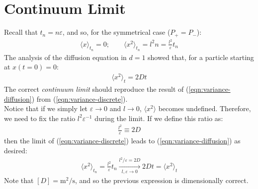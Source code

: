 \documentclass[../template.tex]{subfiles}
\begin{document}
\section{Continuum Limit}
Recall that $t_n = n \varepsilon$, and so, for the symmetrical case ($P_+ = P_-$):
\begin{align}
    \langle x \rangle_{t_n} = 0; \qquad \langle x^2 \rangle_{t_n} = l^2 n = \frac{l^2}{\varepsilon} t_n
    \label{eqn:variance-discrete}
\end{align}
The analysis of the diffusion equation in $d=1$ showed that, for a particle starting at $x(t=0) = 0$: 
\begin{align}
    \langle x^2 \rangle_t = 2Dt
    \label{eqn:variance-diffusion}
\end{align}
The correct \textit{continuum limit} should reproduce the result of (\ref{eqn:variance-diffusion}) from (\ref{eqn:variance-discrete}).\\
Notice that if we simply let $\varepsilon \to 0$ and $l \to 0$, $\langle x^2 \rangle$ becomes undefined. Therefore, we need to fix the ratio $l^2 \varepsilon^{-1}$ during the limit. If we define this ratio as:
\begin{align*}
    \frac{l^2}{\varepsilon} \equiv 2D 
\end{align*}    
then the limit of (\ref{eqn:variance-discrete}) leads to (\ref{eqn:variance-diffusion}) as desired:
\begin{align*}
    \langle x^2 \rangle_{t_n} = \frac{l^2}{\varepsilon} t_n  \xrightarrow[l,\varepsilon \to 0]{l^2/\varepsilon = 2D} 2Dt = \langle x^2 \rangle_t  
\end{align*}
Note that $[D]=\si{\m\squared\per\s}$, and so the previous expression is dimensionally correct.\\
\end{document}
